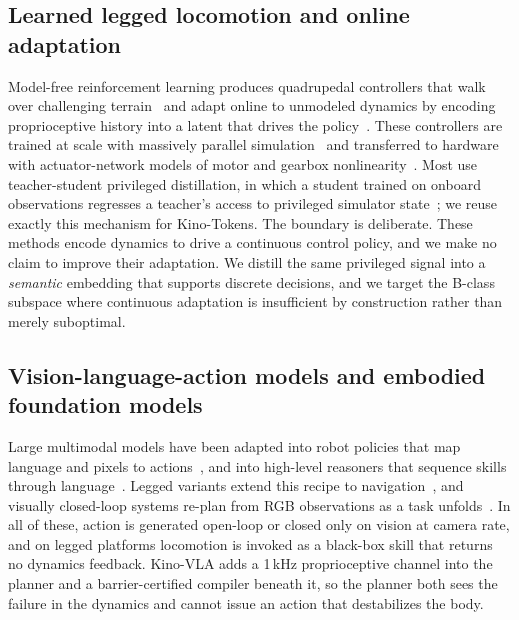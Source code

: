 \documentclass[conference]{IEEEtran}
\newcommand{\kinovla}{Kino-VLA}
\newcommand{\kinotokens}{Kino-Tokens}
\begin{document}
\subsection{Learned legged locomotion and online adaptation}
Model-free reinforcement learning produces quadrupedal controllers that walk over
challenging terrain~\cite{lee2020learning,miki2022learning} and adapt online to
unmodeled dynamics by encoding proprioceptive history into a latent that drives
the policy~\cite{kumar2021rma,nahrendra2023dreamwaq}. These controllers are
trained at scale with massively parallel simulation~\cite{rudin2022learning,makoviychuk2021isaacgym,mittal2023orbit}
and transferred to hardware with actuator-network models of motor and gearbox
nonlinearity~\cite{hwangbo2019learning}. Most use teacher-student privileged
distillation, in which a student trained on onboard observations regresses a
teacher's access to privileged simulator state~\cite{chen2020cheating,lee2020learning};
we reuse exactly this mechanism for \kinotokens{}. The boundary is deliberate. These
methods encode dynamics to drive a continuous control policy, and we make no claim
to improve their adaptation. We distill the same privileged signal into a
\emph{semantic} embedding that supports discrete decisions, and we target the
B-class subspace where continuous adaptation is insufficient by construction rather
than merely suboptimal.

\subsection{Vision-language-action models and embodied foundation models}
Large multimodal models have been adapted into robot policies that map language
and pixels to actions~\cite{brohan2023rt1,brohan2023rt2,kim2024openvla,octo2024,driess2023palme,li2024roboflamingo,black2024pi0},
and into high-level reasoners that sequence skills through language~\cite{ahn2022saycan,liang2023codeaspolicies,huang2022inner}.
Legged variants extend this recipe to navigation~\cite{cheng2024navila,mei2024quadrupedgpt,wu2024doggybot},
and visually closed-loop systems re-plan from RGB observations as a task
unfolds~\cite{bu2024clover,zhi2024comerobot}. In all of these, action is generated
open-loop or closed only on vision at camera rate, and on legged platforms
locomotion is invoked as a black-box skill that returns no dynamics feedback.
\kinovla{} adds a \mbox{1\,kHz} proprioceptive channel into the planner and a
barrier-certified compiler beneath it, so the planner both sees the failure in the
dynamics and cannot issue an action that destabilizes the body.
\end{document}
